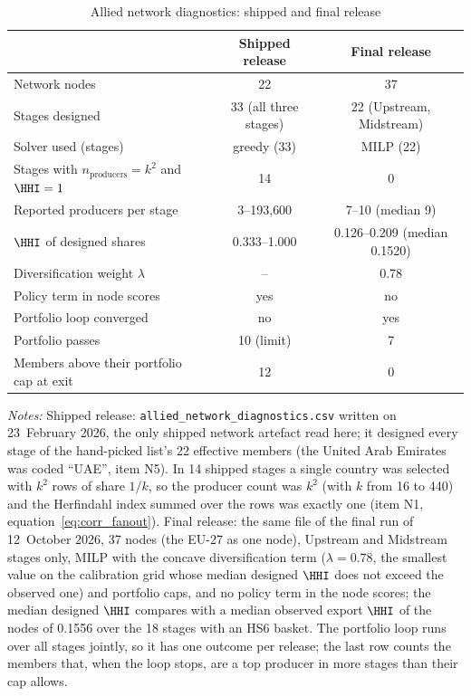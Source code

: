 \begin{table}[htbp]
  \centering
  \begin{threeparttable}
  \caption{Allied network diagnostics: shipped and final release}
  \label{tab:reconcile_network}
  \small
  \begin{tabular}{@{}l c c@{}}
    \toprule
    & Shipped release & Final release \\
    \midrule
    Network nodes & 22 & 37 \\
    Stages designed & 33 (all three stages) & 22 (Upstream, Midstream) \\
    Solver used (stages) & greedy (33) & MILP (22) \\
    Stages with $n_{\text{producers}}=k^2$ and $\HHI=1$ & 14 & 0 \\
    Reported producers per stage & 3--193{,}600 & 7--10 (median 9) \\
    $\HHI$ of designed shares & 0.333--1.000 & 0.126--0.209 (median 0.1520) \\
    Diversification weight $\lambda$ & -- & 0.78 \\
    Policy term in node scores & yes & no \\
    Portfolio loop converged & no & yes \\
    Portfolio passes & 10 (limit) & 7 \\
    Members above their portfolio cap at exit & 12 & 0 \\
    \bottomrule
  \end{tabular}
  \begin{tablenotes}[flushleft]\footnotesize
    \item \emph{Notes:} Shipped release: \texttt{allied\_network\_diagnostics.csv} written on 23~February 2026, the only shipped network artefact read here; it designed every stage of the hand-picked list's 22 effective members (the United Arab Emirates was coded ``UAE'', item N5). In 14 shipped stages a single country was selected with $k^2$ rows of share $1/k$, so the producer count was $k^2$ (with $k$ from 16 to 440) and the Herfindahl index summed over the rows was exactly one (item N1, equation~\eqref{eq:corr_fanout}). Final release: the same file of the final run of 12~October 2026, 37 nodes (the EU-27 as one node), Upstream and Midstream stages only, MILP with the concave diversification term ($\lambda=0.78$, the smallest value on the calibration grid whose median designed $\HHI$ does not exceed the observed one) and portfolio caps, and no policy term in the node scores; the median designed $\HHI$ compares with a median observed export $\HHI$ of the nodes of 0.1556 over the 18 stages with an HS6 basket. The portfolio loop runs over all stages jointly, so it has one outcome per release; the last row counts the members that, when the loop stops, are a top producer in more stages than their cap allows.
  \end{tablenotes}
  \end{threeparttable}
\end{table}
